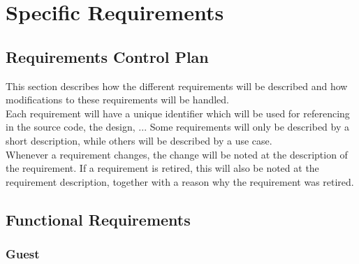 \chapter{Specific Requirements}

\section{Requirements Control Plan}
	This section describes how the different requirements will be described and how 
	modifications to these requirements will be handled. \\
	Each requirement will have a unique identifier which will be used for referencing 
	in the source code, the design, ... Some requirements will only be described by
	a short description, while others will be described by a use case. \\
	Whenever a requirement changes, the change will be noted at the description of 
	the requirement. If a requirement is retired, this will also be noted at the
	requirement description, together with a reason why the requirement was retired.

\section{Functional Requirements} %
	\subsection{Guest}
